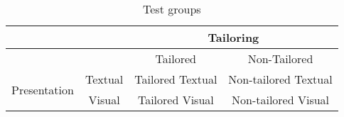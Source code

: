 \begin{table}[H]
\centering
\begin{tabular}{c c | c c}
\toprule
\multicolumn{2}{c}{} & \multicolumn{2}{c}{Tailoring}\\
\midrule
\multicolumn{2}{c}{}  & Tailored & Non-Tailored \\
\hline
\multirow{2}{*}{Presentation}    &   Textual &   Tailored Textual  &  Non-tailored Textual\\
                &   Visual  &   Tailored Visual  &  Non-tailored Visual\\

\bottomrule
\end{tabular}
\caption{Test groups}
\end{table}
